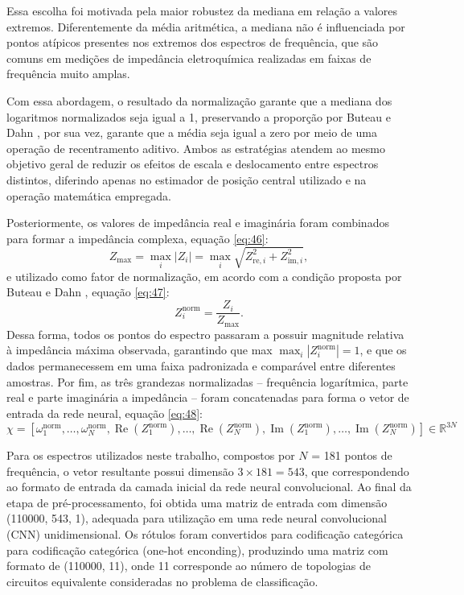 Essa escolha foi motivada pela maior robustez da mediana em relação a valores extremos.
Diferentemente da média aritmética, a mediana não é influenciada por pontos atípicos presentes
nos extremos dos espectros de frequência, que são comuns em medições de impedância
eletroquímica realizadas em faixas de frequência muito amplas.

Com essa abordagem, o
resultado da normalização garante que a mediana dos logaritmos normalizados seja igual a 1,
preservando a proporção por Buteau e Dahn \cite{buteau2019analysis}, por sua vez, garante que a média seja igual a
zero por meio de uma operação de recentramento aditivo. Ambos as estratégias atendem ao
mesmo objetivo geral de reduzir os efeitos de escala e deslocamento entre espectros distintos,
diferindo apenas no estimador de posição central utilizado e na operação matemática
empregada. 

Posteriormente, os valores de impedância real e imaginária foram combinados para
formar a impedância complexa, equação \eqref{eq:46}:
\begin{equation}
Z_{\max}=\max_i |Z_i|
=\max_i \sqrt{Z_{\mathrm{re},i}^{2}+Z_{\mathrm{im},i}^{2}},
\label{eq:46}
\end{equation}
e utilizado como fator de normalização, em acordo com a condição proposta por Buteau e Dahn \cite{buteau2019analysis}, equação \eqref{eq:47}:
\begin{equation}
Z_i^{\mathrm{norm}}
=\frac{Z_i}{Z_{\max}}.
\label{eq:47}
\end{equation}
Dessa forma, todos os pontos do espectro passaram a possuir magnitude relativa à impedância
máxima observada, garantindo que max
$\max_i |Z_i^{\mathrm{norm}}| = 1$, e que os dados permanecessem em uma
faixa padronizada e comparável entre diferentes amostras. Por fim, as três grandezas
normalizadas – frequência logarítmica, parte real e parte imaginária a impedância – foram
concatenadas para forma o vetor de entrada da rede neural, equação \eqref{eq:48}:
\begin{equation}
\chi=
\left[
\omega_1^{\mathrm{norm}},\ldots,\omega_N^{\mathrm{norm}},
\operatorname{Re}\!\left(Z_1^{\mathrm{norm}}\right),\ldots,
\operatorname{Re}\!\left(Z_N^{\mathrm{norm}}\right),
\operatorname{Im}\!\left(Z_1^{\mathrm{norm}}\right),\ldots,
\operatorname{Im}\!\left(Z_N^{\mathrm{norm}}\right)
\right]
\in \mathbb{R}^{3N}
\label{eq:48}
\end{equation}

Para os espectros utilizados neste trabalho, compostos por $N$ = 181 pontos de frequência, o
vetor resultante possui dimensão $3 \times181 = 543$, que correspondendo ao formato de entrada
da camada inicial da rede neural convolucional. Ao final da etapa de pré-processamento, foi
obtida uma matriz de entrada com dimensão (110000, 543, 1), adequada para utilização em
uma rede neural convolucional (CNN) unidimensional. Os rótulos foram convertidos para
codificação categórica para codificação categórica (one-hot enconding), produzindo uma
matriz com formato de (110000, 11), onde 11 corresponde ao número de topologias de
circuitos equivalente consideradas no problema de classificação.

